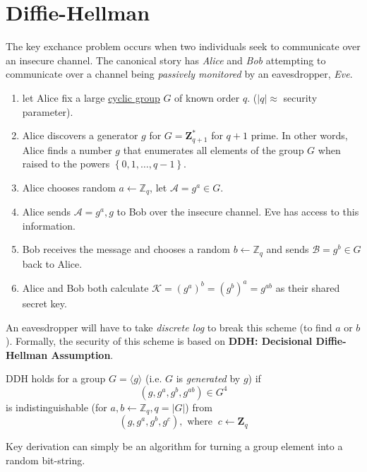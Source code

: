 
\section{Diffie-Hellman}
The key exchance problem occurs when two individuals seek to communicate over an insecure channel. The canonical story has \emph{Alice} and \emph{Bob} attempting to communicate over a channel being \emph{passively monitored} by an eavesdropper, \emph{Eve}.

\begin{definition}
	\begin{enumerate}
		\,
		\item let Alice fix a large \hyperref[def:cyclicgroup]{cyclic group} \(G\) of known order \(q\). (\(|q| \approx \) security parameter).
		\item Alice discovers a generator \(g\) for \(G = \mathbf{Z} _{q+1}^*\) for \(q+1\) prime. In other words, Alice finds a number \(g\) that enumerates all elements of the group \(G\) when raised to the powers \(\left\{ 0, 1, \ldots , q - 1 \right\} \).
		\item Alice chooses random \(a \gets \mathbb{Z} _q\), let \(\mathcal{A} = g^a \in G\).
		\item Alice sends \(\mathcal{A} = g^a, g\)  to Bob over the insecure channel. Eve has access to this information.
		\item Bob receives the message and chooses a random \(b \gets \mathbb{Z} _q\) and sends \(\mathcal{B} = g^b \in G\) back to Alice.
		\item Alice and Bob both calculate \(\mathcal{K} = (g^a)^b = (g^b)^a = g^{ab}\) as their shared secret key.  
	\end{enumerate}
\end{definition}

An eavesdropper will have to take \emph{discrete log} to break this scheme (to find \(a\) or \(b\)). Formally, the security of this scheme is based on \textbf{DDH: Decisional Diffie-Hellman Assumption}.

\begin{definition}
	DDH holds for a group \(G = \langle g \rangle \) (i.e. \(G\) is \emph{generated} by \(g\)) if \[(g, g^a, g^b, g^{ab}) \in G^4\] is indistinguishable (for \(a, b \gets \mathbb{Z} _q, q = |G|\)) from \[(g, g^a, g^b, g^c), \text{ where }\: c \gets \mathbf{Z} _q\]
\end{definition}
\begin{remark}
	Key derivation can simply be an algorithm for turning a group element into a random bit-string.
\end{remark}

